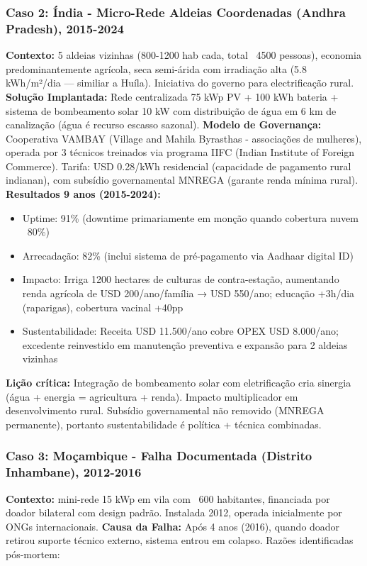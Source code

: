 \documentclass[12pt, a4paper]{article}
\begin{document}
\subsubsection{Caso 2: Índia - Micro-Rede Aldeias Coordenadas (Andhra Pradesh), 2015-2024}
\textbf{Contexto:} 5 aldeias vizinhas (800-1200 hab cada, total ~4500 pessoas), economia predominantemente agrícola, seca semi-árida com irradiação alta (5.8 kWh/m²/dia — similiar a Huíla). Iniciativa do governo para electrificação rural.
\textbf{Solução Implantada:} Rede centralizada 75 kWp PV + 100 kWh bateria + sistema de bombeamento solar 10 kW com distribuição de água em 6 km de canalização (água é recurso escasso sazonal).
\textbf{Modelo de Governança:} Cooperativa VAMBAY (Village and Mahila Byrasthas - associações de mulheres), operada por 3 técnicos treinados via programa IIFC (Indian Institute of Foreign Commerce). Tarifa: USD 0.28/kWh residencial (capacidade de pagamento rural indianan), com subsídio governamental MNREGA (garante renda mínima rural).
\textbf{Resultados 9 anos (2015-2024):}
\begin{itemize}
\item Uptime: 91\% (downtime primariamente em monção quando cobertura nuvem ~80\%)
\item Arrecadação: 82\% (inclui sistema de pré-pagamento via Aadhaar digital ID)
\item Impacto: Irriga 1200 hectares de culturas de contra-estação, aumentando renda agrícola de USD 200/ano/família → USD 550/ano; educação +3h/dia (raparigas), cobertura vacinal +40pp
\item Sustentabilidade: Receita USD 11.500/ano cobre OPEX USD 8.000/ano; excedente reinvestido em manutenção preventiva e expansão para 2 aldeias vizinhas
\end{itemize}\textbf{Lição crítica:} Integração de bombeamento solar com eletrificação cria sinergia (água + energia = agricultura + renda). Impacto multiplicador em desenvolvimento rural. Subsídio governamental não removido (MNREGA permanente), portanto sustentabilidade é política + técnica combinadas.

\subsubsection{Caso 3: Moçambique - Falha Documentada (Distrito Inhambane), 2012-2016}
\textbf{Contexto:} mini-rede 15 kWp em vila com ~600 habitantes, financiada por doador bilateral com design padrão. Instalada 2012, operada inicialmente por ONGs internacionais.
\textbf{Causa da Falha:} Após 4 anos (2016), quando doador retirou suporte técnico externo, sistema entrou em colapso. Razões identificadas pós-mortem:
\end{document}
